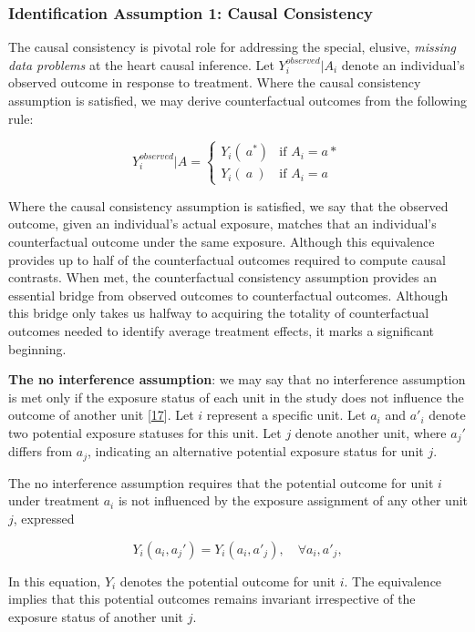 \documentclass[
  singlecolumn]{article}
\begin{document}
\hypertarget{identification-assumption-1-causal-consistency}{%
\subsubsection{Identification Assumption 1: Causal
Consistency}\label{identification-assumption-1-causal-consistency}}

The causal consistency is pivotal role for addressing the special,
elusive, \emph{missing data problems} at the heart causal inference. Let
\(Y_i^{observed}|A_i\) denote an individual's observed outcome in
response to treatment. Where the causal consistency assumption is
satisfied, we may derive counterfactual outcomes from the following
rule:

\[
Y_i^{observed}|A = 
\begin{cases} 
Y_i(~a^*) & \text{if } A_i = a* \\
Y_i(~a~) & \text{if } A_i = a
\end{cases}
\]

Where the causal consistency assumption is satisfied, we say that the
observed outcome, given an individual's actual exposure, matches that an
individual's counterfactual outcome under the same exposure. Although
this equivalence provides up to half of the counterfactual outcomes
required to compute causal contrasts. When met, the counterfactual
consistency assumption provides an essential bridge from observed
outcomes to counterfactual outcomes. Although this bridge only takes us
halfway to acquiring the totality of counterfactual outcomes needed to
identify average treatment effects, it marks a significant beginning.

\textbf{The no interference assumption}: we may say that no interference
assumption is met only if the exposure status of each unit in the study
does not influence the outcome of another unit
{[}\protect\hyperlink{ref-rubin2005}{17}{]}. Let \(i\) represent a
specific unit. Let \(a_i\) and \(a'_i\) denote two potential exposure
statuses for this unit. Let \(j\) denote another unit, where \(a_j'\)
differs from \(a_j\), indicating an alternative potential exposure
status for unit \(j\).

The no interference assumption requires that the potential outcome for
unit \(i\) under treatment \(a_i\) is not influenced by the exposure
assignment of any other unit \(j\), expressed

\[
Y_i(a_i, a_j') = Y_i(a_i, a'_j), \quad \forall a_i, a'_j,
\]

In this equation, \(Y_i\) denotes the potential outcome for unit \(i\).
The equivalence implies that this potential outcomes remains invariant
irrespective of the exposure status of another unit \(j\).
\end{document}
